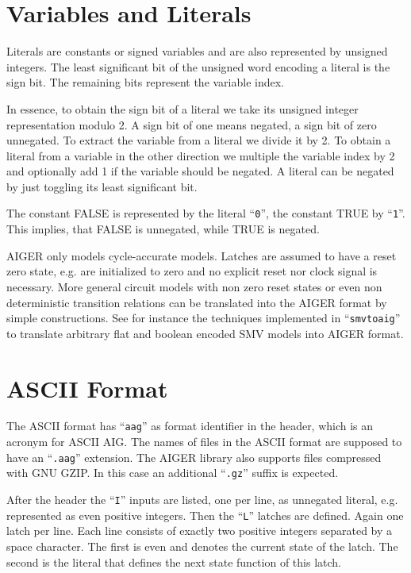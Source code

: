 \documentclass{llncs}
\begin{document}
\section{Variables and Literals}

  Literals are constants or signed variables and are also represented by
  unsigned integers.  The least significant bit of the unsigned word
  encoding a literal is the sign bit.  The remaining bits represent the
  variable index.
  
  In essence, to obtain the sign bit of a literal we take its unsigned
  integer representation modulo 2.  A sign bit of one means negated, a sign
  bit of zero unnegated.  To extract the variable from a literal we divide
  it by 2.  To obtain a literal from a variable in the other direction we
  multiple the variable index by 2 and optionally add 1 if the variable
  should be negated.   A literal can be negated by just toggling its least
  significant bit.
  
  The constant FALSE is represented by the literal ``\texttt{0}'', the constant TRUE by
  ``\texttt{1}''.  This implies, that FALSE is unnegated, while TRUE is negated.

  AIGER only models cycle-accurate models.  Latches are assumed to have a
  reset zero state, e.g. are initialized to zero and no explicit reset nor
  clock signal is necessary.  More general circuit models with non zero
  reset states or even non deterministic transition relations can be
  translated into the AIGER format by simple constructions.  See for
  instance the techniques implemented in ``\texttt{smvtoaig}'' to translate 
  arbitrary flat and boolean encoded SMV models into AIGER format.

\section{ASCII Format}
  
  The ASCII format has ``\texttt{aag}'' as format identifier in the header, which is an
  acronym for ASCII AIG.  The names of files in the ASCII format are
  supposed to have an ``\texttt{.aag}''  extension.  The AIGER library also supports
  files compressed with GNU GZIP.  In this case an additional ``\texttt{.gz}'' suffix
  is expected.

  After the header the ``\texttt{I}'' inputs are listed, one per line, as unnegated
  literal, e.g.  represented as even positive integers.  Then the ``\texttt{L}''
  latches are defined.  Again one latch per line.  Each line consists of
  exactly two positive integers separated by a space character.  The first
  is even and denotes the current state of the latch. The second is the
  literal that defines the next state function of this latch.  
  
\end{document}
